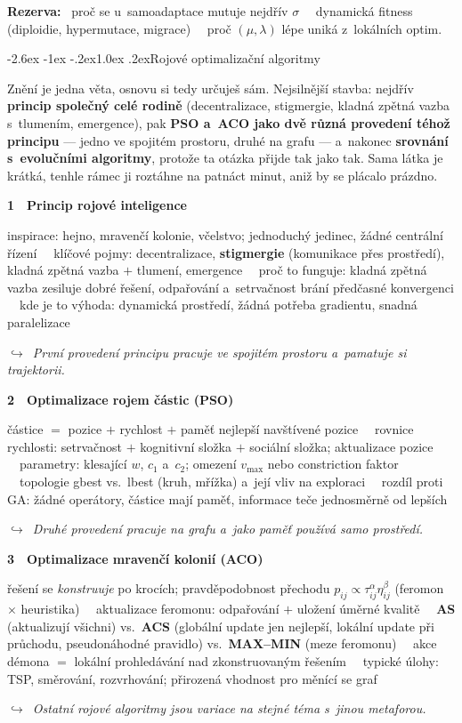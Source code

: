 \documentclass[11pt,a4paper]{article}
\makeatletter
\newcommand{\tb}{\ \textcolor{defframe}{\textbullet}\ }
\newcommand{\blok}[2]{\par\addvspace{2.4mm}\noindent
  \textcolor{blokcol}{\textbf{#1}}\ \ \textbf{#2}\par\nobreak}
\newcommand{\tema}[1]{\par\nobreak\noindent #1\par}
\newcommand{\most}[1]{\par\nobreak\noindent
  {\small\itshape\textcolor{mostcol}{$\hookrightarrow$\ #1}}\par}
\newcommand{\lbl}[1]{\par\addvspace{1.8mm}\noindent
  \textcolor{markcol}{\textbf{\small #1}}\ \ignorespaces}
\newcommand{\zneni}[1]{\par\nobreak\vspace{-1.2mm}\noindent
  {\small\itshape\uv{#1}}\par\addvspace{1.2mm}}
\renewcommand\section{\@startsection{section}{1}{\z@}%
  {-2.6ex \@plus -1ex \@minus -.2ex}{1.0ex \@plus.2ex}{\normalfont\Large\bfseries}}
\makeatother
\begin{document}
\lbl{Rezerva:} proč se u~samoadaptace mutuje nejdřív $\sigma$ \tb dynamická fitness
(diploidie, hypermutace, migrace) \tb proč $(\mu,\lambda)$ lépe uniká z~lokálních optim.

\section{Rojové optimalizační algoritmy}
\zneni{Rojové optimalizační algoritmy.}

\begin{nitbox}
Znění je jedna věta, osnovu si tedy určuješ sám. Nejsilnější stavba: nejdřív \textbf{princip
společný celé rodině} (decentralizace, stigmergie, kladná zpětná vazba s~tlumením,
emergence), pak \textbf{PSO a~ACO jako dvě různá provedení téhož principu} --- jedno ve
spojitém prostoru, druhé na grafu --- a~nakonec \textbf{srovnání s~evolučními algoritmy},
protože ta otázka přijde tak jako tak. Sama látka je krátká, tenhle rámec ji roztáhne na
patnáct minut, aniž by se plácalo prázdno.
\end{nitbox}

\blok{1}{Princip rojové inteligence}
\tema{inspirace: hejno, mravenčí kolonie, včelstvo; jednoduchý jedinec, žádné centrální
řízení
\tb klíčové pojmy: decentralizace, \textbf{stigmergie} (komunikace přes prostředí), kladná
zpětná vazba $+$ tlumení, emergence
\tb proč to funguje: kladná zpětná vazba zesiluje dobré řešení, odpařování a~setrvačnost
brání předčasné konvergenci
\tb kde je to výhoda: dynamická prostředí, žádná potřeba gradientu, snadná paralelizace}
\most{První provedení principu pracuje ve spojitém prostoru a~pamatuje si trajektorii.}

\blok{2}{Optimalizace rojem částic (PSO)}
\tema{částice $=$ pozice $+$ rychlost $+$ paměť nejlepší navštívené pozice
\tb rovnice rychlosti: setrvačnost $+$ kognitivní složka $+$ sociální složka; aktualizace
pozice
\tb parametry: klesající $w$, $c_1$ a~$c_2$; omezení $v_{\max}$ nebo constriction faktor
\tb topologie gbest vs.\ lbest (kruh, mřížka) a~její vliv na exploraci
\tb rozdíl proti GA: žádné operátory, částice mají paměť, informace teče jednosměrně od
lepších}
\most{Druhé provedení pracuje na grafu a~jako paměť používá samo prostředí.}

\blok{3}{Optimalizace mravenčí kolonií (ACO)}
\tema{řešení se \emph{konstruuje} po krocích; pravděpodobnost přechodu
$p_{ij} \propto \tau_{ij}^\alpha \eta_{ij}^\beta$ (feromon $\times$ heuristika)
\tb aktualizace feromonu: odpařování $+$ uložení úměrné kvalitě
\tb \textbf{AS} (aktualizují všichni) vs.\ \textbf{ACS} (globální update jen nejlepší,
lokální update při průchodu, pseudonáhodné pravidlo) vs.\ \textbf{MAX--MIN} (meze feromonu)
\tb akce démona $=$ lokální prohledávání nad zkonstruovaným řešením
\tb typické úlohy: TSP, směrování, rozvrhování; přirozená vhodnost pro měnící se graf}
\most{Ostatní rojové algoritmy jsou variace na stejné téma s~jinou metaforou.}
\end{document}
